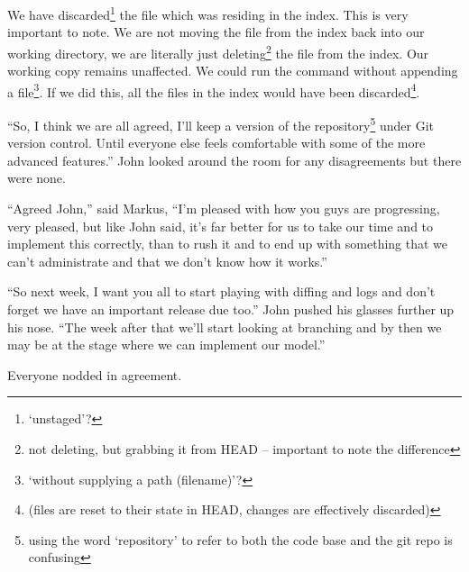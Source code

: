 We have discarded\footnote{`unstaged'?} the file which was residing in the index.
This is very important to note.
We are not moving the file from the index back into our working directory, we are literally just deleting\footnote{not deleting, but grabbing it from HEAD -- important to note the difference} the file from the index.
Our working copy remains unaffected.
We could run the  command without appending a file\footnote{`without supplying a path (filename)'?}.
If we did this, all the files in the index would have been discarded\footnote{(files are reset to their state in HEAD, changes are effectively discarded)}.

\begin{trenches}
``So, I think we are all agreed, I'll keep a version of the repository\footnote{using the word `repository' to refer to both the code base and the git repo is confusing} under Git version control.
Until everyone else feels comfortable with some of the more advanced features.'' John looked around the room for any disagreements but there were none.

``Agreed John,'' said Markus, ``I'm pleased with how you guys are progressing, very pleased, but like John said, it's far better for us to take our time and to implement this correctly, than to rush it and to end up with something that we can't administrate and that we don't know how it works.''

``So next week, I want you all to start playing with diffing and logs and don't forget we have an important release due too.'' John pushed his glasses further up his nose.
``The week after that we'll start looking at branching and by then we may be at the stage where we can implement our model.''

Everyone nodded in agreement.
\end{trenches}

